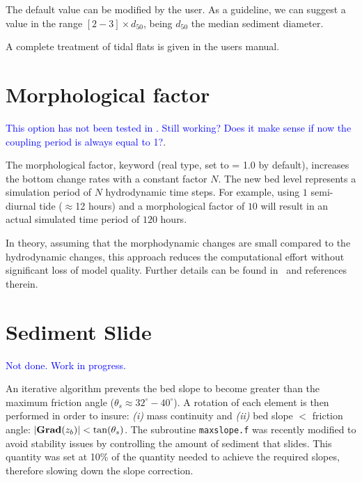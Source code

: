 The default value can be modified by the user. As a guideline, we can suggest a value in the range $[2-3]\times d_{50}$, being $d_{50}$ the median sediment diameter.

A complete treatment of tidal flats is given in the  users manual.


\section{Morphological factor}
\textcolor{blue}{This option has not been tested in \gaia{}. Still working? Does it make sense if now the coupling period is always equal to 1?}.

The morphological factor, keyword  (real type, set to {\ttfamily = 1.0} by default), increases the bottom change rates with a constant factor $N$. The new bed level represents a simulation period of $N$ hydrodynamic time steps. For example, using $1$ semi-diurnal tide ($\approx$12 hours) and a morphological factor of $10$ will result in an actual simulated time period of $120$ hours.

In theory, assuming that the morphodynamic changes are small compared to the hydrodynamic changes,
this approach reduces the computational effort without significant loss of model quality. Further details can be found in~\cite{Knaapen12} and references therein.

\section{Sediment Slide}
\textcolor{blue}{Not done. Work in progress.}

An iterative algorithm prevents the bed slope to become greater than the maximum friction angle ($\theta_s \approx 32^\circ-40^\circ$). A rotation of each element is then performed in order to insure: \textit{(i)} mass continuity and \textit{(ii)} bed slope $<$ friction angle: $|\text{\bfseries{Grad}}(z_b)| < \tan(\theta_s)$. The subroutine \texttt{maxslope.f} was recently modified to avoid stability issues by controlling the amount of sediment that slides. This quantity was set at 10\% of the quantity needed to achieve the required slopes, therefore slowing down the slope correction.\\

